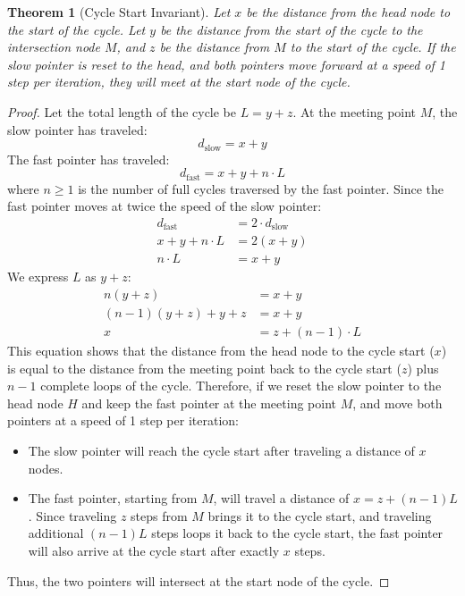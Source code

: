 \documentclass[10pt,journal,compsoc,onecolumn]{IEEEtran}
\newtheorem{theorem}{Theorem}
\begin{document}
\begin{theorem}[Cycle Start Invariant]
Let $x$ be the distance from the head node to the start of the cycle. Let $y$ be the distance from the start of the cycle to the intersection node $M$, and $z$ be the distance from $M$ to the start of the cycle. If the slow pointer is reset to the head, and both pointers move forward at a speed of 1 step per iteration, they will meet at the start node of the cycle.
\end{theorem}
\begin{proof}
Let the total length of the cycle be $L = y + z$.
At the meeting point $M$, the slow pointer has traveled:
\[
d_{\text{slow}} = x + y
\]
The fast pointer has traveled:
\[
d_{\text{fast}} = x + y + n \cdot L
\]
where $n \ge 1$ is the number of full cycles traversed by the fast pointer.
Since the fast pointer moves at twice the speed of the slow pointer:
\begin{align*}
d_{\text{fast}} &= 2 \cdot d_{\text{slow}} \\
x + y + n \cdot L &= 2(x + y) \\
n \cdot L &= x + y
\end{align*}
We express $L$ as $y + z$:
\begin{align*}
n(y + z) &= x + y \\
(n - 1)(y + z) + y + z &= x + y \\
x &= z + (n - 1) \cdot L
\end{align*}
This equation shows that the distance from the head node to the cycle start ($x$) is equal to the distance from the meeting point back to the cycle start ($z$) plus $n - 1$ complete loops of the cycle.
Therefore, if we reset the slow pointer to the head node $H$ and keep the fast pointer at the meeting point $M$, and move both pointers at a speed of 1 step per iteration:
\begin{itemize}
    \item The slow pointer will reach the cycle start after traveling a distance of $x$ nodes.
    \item The fast pointer, starting from $M$, will travel a distance of $x = z + (n-1)L$. Since traveling $z$ steps from $M$ brings it to the cycle start, and traveling additional $(n-1)L$ steps loops it back to the cycle start, the fast pointer will also arrive at the cycle start after exactly $x$ steps.
\end{itemize}
Thus, the two pointers will intersect at the start node of the cycle.
\end{proof}
\end{document}

